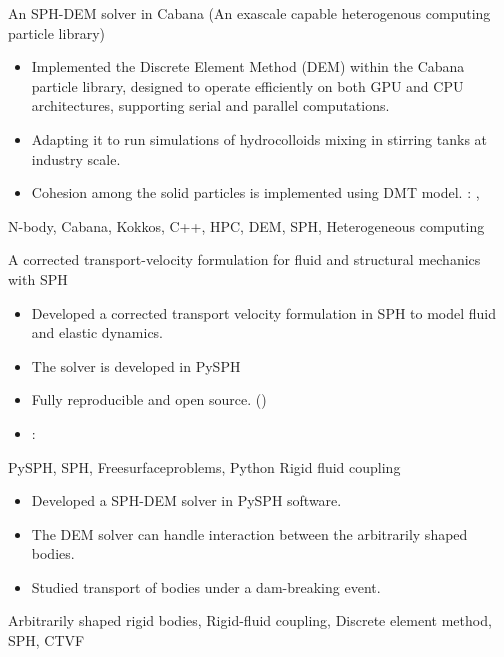 %
%



\begin{experiences}

  \experience
  {} {An SPH-DEM solver in Cabana (An exascale capable heterogenous computing particle library)}{}{}
  {}    {
    \begin{itemize}
    \item Implemented the Discrete Element Method (DEM) within the Cabana
      particle library, designed to operate efficiently on both GPU and CPU
      architectures, supporting serial and parallel computations.
    \item Adapting it to run simulations of hydrocolloids mixing in stirring
      tanks at industry scale.
    \item Cohesion among the solid particles is implemented using DMT model.
      \faGithub: ,
    \end{itemize}
  }
  {N-body, Cabana, Kokkos, C++, HPC, DEM, SPH, Heterogeneous computing}

  \emptySeparator
  \experience
    {}   {A corrected transport-velocity formulation for fluid and structural mechanics with SPH}{}{}
    {} {
                      \begin{itemize}
                      \item Developed a corrected transport velocity formulation in SPH to model
                        fluid and elastic dynamics.
                      \item The solver is developed in PySPH %
                      \item Fully reproducible and open source. ()
                      \item \faGithub: 
                      \end{itemize}
                    }
                    {PySPH, SPH, Freesurfaceproblems, Python}
  \emptySeparator
  \experience
  {} {Rigid fluid coupling}{}{}
  {}    {
                    \begin{itemize}
                    \item Developed a SPH-DEM solver in PySPH software.
                    \item The DEM solver can handle interaction between the arbitrarily shaped bodies.
                    \item Studied transport of bodies under a dam-breaking event.
                    \end{itemize}
                  }
                  {Arbitrarily shaped rigid bodies, Rigid-fluid coupling, Discrete element method, SPH, CTVF}


\end{experiences}
